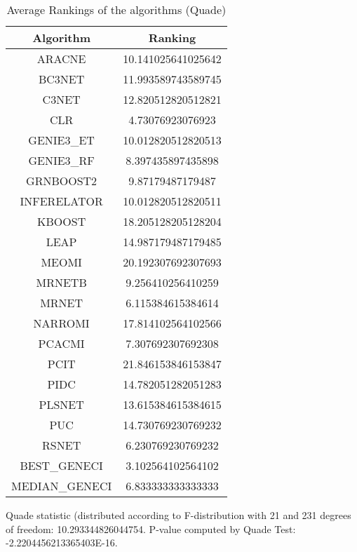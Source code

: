 \documentclass[a4paper,10pt]{article}
\begin{document}
\begin{landscape}
\begin{table}[!htp]
\centering
\caption{Average Rankings of the algorithms (Quade)
}\begin{tabular}{c|c}
Algorithm&Ranking\\
\hline
ARACNE&10.141025641025642\\
BC3NET&11.993589743589745\\
C3NET&12.820512820512821\\
CLR&4.73076923076923\\
GENIE3_ET&10.012820512820513\\
GENIE3_RF&8.397435897435898\\
GRNBOOST2&9.87179487179487\\
INFERELATOR&10.012820512820511\\
KBOOST&18.205128205128204\\
LEAP&14.987179487179485\\
MEOMI&20.192307692307693\\
MRNETB&9.256410256410259\\
MRNET&6.115384615384614\\
NARROMI&17.814102564102566\\
PCACMI&7.307692307692308\\
PCIT&21.846153846153847\\
PIDC&14.782051282051283\\
PLSNET&13.615384615384615\\
PUC&14.730769230769232\\
RSNET&6.230769230769232\\
BEST_GENECI&3.102564102564102\\
MEDIAN_GENECI&6.833333333333333\\
\end{tabular}
\end{table}
Quade statistic (distributed according to F-distribution with 21 and 231 degrees of freedom: 10.293344826044754. 
P-value computed by Quade Test: -2.2204456213365403E-16.\newline


\newpage


\end{landscape}
\end{document}

